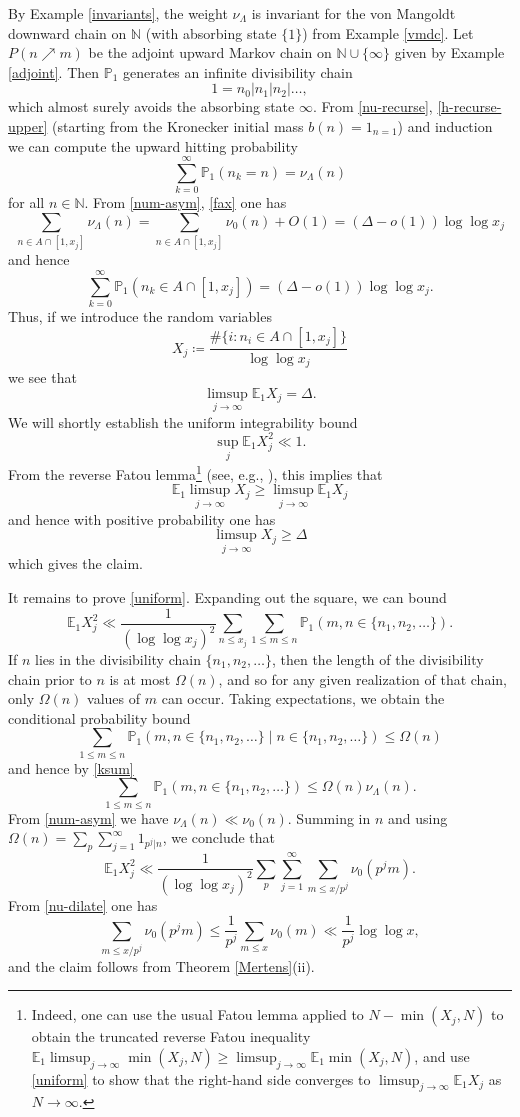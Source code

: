 \documentclass[12pt]{amsart}
\theoremstyle{definition}
\theoremstyle{remark}
\numberwithin{equation}{section}
\newcommand{\N}{{\mathbb N}}
\newcommand{\E}{{\mathbb E}}
\newcommand{\nuMangoldt}{\nu_{\Lambda}}
\newcommand{\1}{{\mathbf 1}}
\begin{document}
By Example \ref{invariants}, the weight $\nuMangoldt$ is invariant for the von Mangoldt downward chain on $\N$ (with absorbing state $\{1\}$) from Example \ref{vmdc}.  Let $P(n \nearrow m)$ be the adjoint upward Markov chain on $\N \cup \{\infty\}$ given by Example \ref{adjoint}.  Then ${\mathbb P}_1$ generates an infinite divisibility chain
$$ 1 = n_0 | n_1 | n_2 | \dots,$$
which almost surely avoids the absorbing state $\infty$.  From \eqref{nu-recurse}, \eqref{h-recurse-upper} (starting from the Kronecker initial mass $b(n) = 1_{n=1}$) and induction we can compute the upward hitting probability
\begin{equation}\label{ksum}
\sum_{k=0}^\infty {\mathbb P}_1( n_k = n ) = \nuMangoldt(n)
\end{equation}
for all $n \in \N$. From \eqref{num-asym}, \eqref{fax} one has
$$ \sum_{n \in A \cap [1,x_j]} \nuMangoldt(n) = \sum_{n \in A \cap [1,x_j]} \nu_0(n)  + O(1) = (\Delta-o(1)) \log\log x_j$$
and hence
$$ \sum_{k=0}^\infty {\mathbb P}_1( n_k \in A \cap [1,x_j]) = (\Delta-o(1)) \log\log x_j.$$
Thus, if we introduce the random variables
$$ X_j \coloneq \frac{\# \{ i: n_i \in A \cap [1,x_j]\}}{\log\log x_j}$$
we see that
$$ \limsup_{j \to \infty} \E_1 X_j = \Delta.$$
We will shortly establish the uniform integrability bound
\begin{equation}\label{uniform}
 \sup_j \E_1 X_j^2 \ll 1.
\end{equation}
From the reverse Fatou lemma\footnote{Indeed, one can use the usual Fatou lemma applied to $N - \min(X_j,N)$ to obtain the truncated reverse Fatou inequality $\E_1 \limsup_{j \to \infty} \min(X_j,N) \geq \limsup_{j \to \infty} \E_1 \min(X_j,N)$, and use \eqref{uniform} to show that the right-hand side converges to $\limsup_{j \to \infty} \E_1 X_j$ as $N \to \infty$.}
(see, e.g., \cite[Corollary 4.2]{Kamihigashi2017}), this implies that
$$ \E_1 \limsup_{j \to \infty} X_j \geq \limsup_{j \to \infty} \E_1 X_j$$
and hence with positive probability one has
$$ \limsup_{j \to \infty} X_j \geq \Delta$$
which gives the claim.

It remains to prove \eqref{uniform}.  Expanding out the square, we can bound
$$ \E_1 X_j^2 \ll \frac{1}{(\log\log x_j)^2} \sum_{n \leq x_j} \sum_{1 \leq m \leq n} \mathbb{P}_1( m, n \in \{n_1, n_2, \dots\}).$$
If $n$ lies in the divisibility chain $\{n_1,n_2,\dots\}$, then the length of the divisibility chain prior to $n$ is at most $\Omega(n)$, and so for any given realization of that chain, only $\Omega(n)$ values of $m$ can occur.  Taking expectations, we obtain the conditional probability bound
$$ \sum_{1 \leq m \leq n} \mathbb{P}_1( m, n \in \{n_1, n_2, \dots\} \mid n \in \{n_1,n_2,\dots\}) \leq \Omega(n)$$
and hence by \eqref{ksum}
$$ \sum_{1 \leq m \leq n} \mathbb{P}_1( m, n \in \{n_1, n_2, \dots\}) \leq \Omega(n) \nuMangoldt(n).$$
From \eqref{num-asym} we have $\nuMangoldt(n) \ll \nu_0(n)$.
Summing in $n$ and using $\Omega(n) = \sum_p \sum_{j=1}^\infty 1_{p^j|n}$, we conclude that
$$  \E_1 X_j^2 \ll \frac{1}{(\log\log x_j)^2}\sum_p \sum_{j=1}^\infty \sum_{m \leq x / p^j} \nu_0(p^j m).$$
From \eqref{nu-dilate} one has
$$\sum_{m \leq x / p^j} \nu_0(p^j m) 
\leq \frac{1}{p^j} \sum_{m \leq x} \nu_0(m) \ll \frac{1}{p^j} \log\log x,$$
and the claim follows from Theorem \ref{Mertens}(ii).
\end{document}
